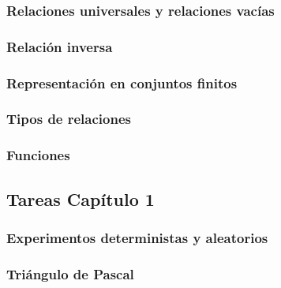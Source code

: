 \documentclass{article}
\begin{document}
\subsubsection{Relaciones universales y relaciones vacías}


\subsubsection{Relación inversa}


\subsubsection{Representación en conjuntos finitos}


\subsubsection{Tipos de relaciones}


\subsubsection{Funciones}
 


\clearpage
\subsection{Tareas Capítulo 1}

\subsubsection{Experimentos deterministas y aleatorios}


\subsubsection{Triángulo de Pascal}

%
\end{document}
